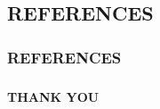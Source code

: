\documentclass[12pt]{beamer}
\begin{document}
	\begin{frame}
 \section{REFERENCES}
		\frametitle{REFERENCES}
 
 
 \end{frame}
	
	\begin{frame}
\frametitle{\phantom{ }}  		
  \centering\Large{\textbf{ THANK YOU}}
		
		
		
	\end{frame}
\end{document}
